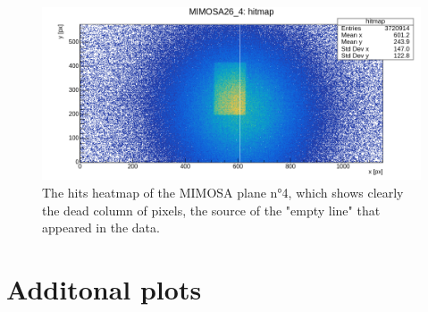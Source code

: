 \begin{figure}[h!tbp]
    \centering
    \includegraphics[width=.9\linewidth]{Images/appendix/hits_MIMOSA4.png}
    \caption{The hits heatmap of the MIMOSA plane n°4, which shows clearly the dead column of pixels, the source of the "empty line" that appeared in the data.}
    \label{fig:MIMOSA4_hits}
\end{figure}



\section{Additonal plots}\label{sec:additional_plots}

